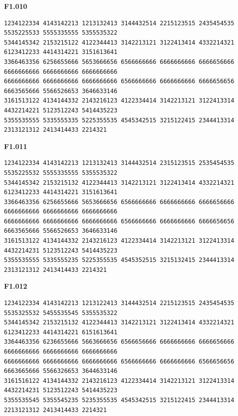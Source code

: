 \noindent\begin{minipage}{\linewidth}\textbf{F1.010}
\begin{lstlisting}
1234122334 4143142213 1213132413 3144432514 2215123515 2435454535 5535225533 5555335555 5355535322
5344145342 2153215122 4122344413 3142213121 3122413414 4332214321 6123412233 4414314221 3151613641
3366463356 6256655666 5653666656 6566666666 6666666666 6666656666 6666666666 6666666666 6666666666
6666666666 6666666666 6666666666 6566666666 6666666666 6666656656 6663565666 5566526653 3646633146
3161513122 4134144332 2143216123 4122334414 3142213121 3122413314 4432214221 5123512243 5414435223
5355535555 5335555335 5225355535 4545342515 3215122415 2344413314 2313121312 2413414433 2214321
\end{lstlisting}
\end{minipage}\par\smallskip

\noindent\begin{minipage}{\linewidth}\textbf{F1.011}
\begin{lstlisting}
1234122334 4143142213 1213132413 3144432514 2315123515 2535454535 5535225532 5555335555 5355535322
5344145342 2153215132 4122344413 3142213121 3122413414 4332214321 6123412233 4414314221 3151613641
3366463356 6256655666 5653666656 6566666666 6666666666 6666656666 6666666666 6666666666 6666666666
6666666666 6666666666 6666666666 6566666666 6666666666 6666656656 6663565666 5566526653 3646633146
3161513122 4134144332 2143216123 4122334414 3142213121 3122413314 4432214231 5123512243 5414435223
5355535555 5335555235 5225355535 4545352515 3215132415 2344413314 2313121312 2413414433 2214321
\end{lstlisting}
\end{minipage}\par\smallskip

\noindent\begin{minipage}{\linewidth}\textbf{F1.012}
\begin{lstlisting}
1234122334 4143142213 1213122413 3144432514 2215123515 2435454535 5535325532 5455535545 5355535322
5344145342 2153215132 4122344413 3142213121 3122413414 4332214321 6123412233 4414314221 6151613641
3364463356 6236655666 5663666656 6566656666 6666666666 6666656666 6666666666 6666666666 6666666666
6666666666 6666666666 6666666666 6566666666 6666666666 6566656656 6663665666 5566326653 3644633146
3161516122 4134144332 2143216123 4122334414 3142213121 3122413314 4432214231 5123512243 5414435223
5355535545 5355545235 5235355535 4545342515 3215122415 2344413314 2213121312 2413414433 2214321
\end{lstlisting}
\end{minipage}\par\smallskip

